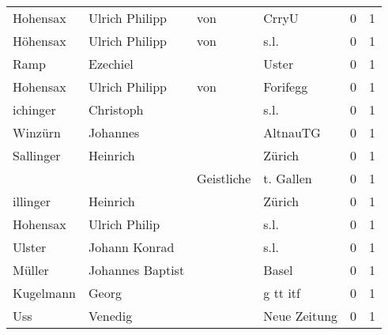 \begin{tabular}{llllrr}
                 Hohensax &                     Ulrich Philipp &         von &                                       CrryU &          0 &         1 \\
                 Höhensax &                     Ulrich Philipp &         von &                                        s.l. &          0 &         1 \\
                     Ramp &                           Ezechiel &             &                                       Uster &          0 &         1 \\
                 Hohensax &                     Ulrich Philipp &         von &                                    Forifegg &          0 &         1 \\
                 ichinger &                          Christoph &             &                                        s.l. &          0 &         1 \\
                  Winzürn &                           Johannes &             &                                    AltnauTG &          0 &         1 \\
                Sallinger &                           Heinrich &             &                                      Zürich &          0 &         1 \\
                          &                                    &  Geistliche &                                   t. Gallen &          0 &         1 \\
                 illinger &                           Heinrich &             &                                      Zürich &          0 &         1 \\
                 Hohensax &                      Ulrich Philip &             &                                        s.l. &          0 &         1 \\
                   Ulster &                      Johann Konrad &             &                                        s.l. &          0 &         1 \\
                   Müller &                   Johannes Baptist &             &                                       Basel &          0 &         1 \\
                Kugelmann &                              Georg &             &                                    g tt itf &          0 &         1 \\
                      Uss &                            Venedig &             &                                Neue Zeitung &          0 &         1 \\

\end{tabular}
